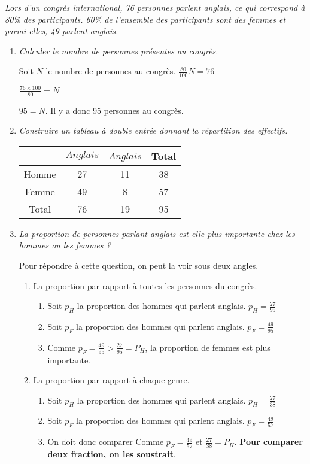 
\textit{Lors d'un congrès international, 76  personnes parlent anglais, ce qui correspond à 80\% des participants. 60\% de l'ensemble des participants sont des femmes et parmi elles, 49  parlent anglais.}

\begin{enumerate}
\item \textit{Calculer le nombre de personnes présentes au congrès.}

Soit $N$ le nombre de personnes au congrès. $\frac{80}{100}N= 76$

$\frac{76 \times 100}{80}= N$

$95= N$. Il y a donc 95 personnes au congrès.

\item \textit{Construire un tableau à double entrée donnant la répartition des effectifs.}

\begin{tabular}{|c|c|c|c|}
\hline 
  & $Anglais$ & $\overline{Anglais}$ & Total \\ 
\hline 
Homme  & 27 & 11 & 38 \\ 
\hline 
Femme & 49 & 8 & 57 \\ 
\hline 
Total & 76 & 19 & 95 \\ 
\hline 
\end{tabular} 


\item \textit{La proportion de personnes parlant anglais est-elle plus importante chez les hommes ou les femmes ?}

Pour répondre à cette question, on peut la voir sous deux angles.

\begin{enumerate}
\item La proportion par rapport à toutes les personnes du congrès.
\begin{enumerate}
\item Soit $p_H$ la proportion des hommes qui parlent anglais. $p_H=\frac{27}{95}$
\item Soit $p_F$ la proportion des hommes qui parlent anglais. $p_F=\frac{49}{95}$
\item Comme  $p_F=\frac{49}{95} > \frac{27}{95}=P_H$, la proportion de femmes est plus importante.
\end{enumerate}

 \item La proportion par rapport à chaque genre.
\begin{enumerate}
\item Soit $p_H$ la proportion des hommes qui parlent anglais. $p_H=\frac{27}{38}$
\item Soit $p_F$ la proportion des hommes qui parlent anglais. $p_F=\frac{49}{57}$
\item On doit donc comparer Comme  $p_F=\frac{49}{57}$ et $\frac{27}{38}=P_H$. \textbf{Pour comparer deux fraction, on les soustrait}.


\end{enumerate}
\end{enumerate}
\end{enumerate}
